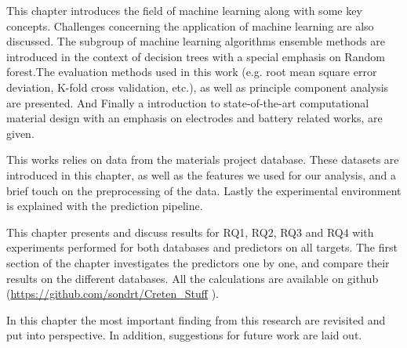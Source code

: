 
This chapter introduces the field of machine learning along with some key concepts. Challenges concerning the application of machine learning are also discussed. The subgroup of machine learning algorithms ensemble methods are introduced in the context of decision trees with a special emphasis on Random forest.The evaluation methods used in this work (e.g. root mean square error deviation, K-fold cross validation, etc.), as well as principle component analysis are presented. And Finally a introduction to state-of-the-art computational material design with an emphasis on electrodes and battery related works, are given. 




This works relies on data from the materials project database. These datasets are introduced in this chapter, as well as the features we used for our analysis, and a brief touch on the preprocessing of the data. Lastly the experimental environment is explained with the prediction pipeline. 




This chapter presents and discuss results for RQ1, RQ2, RQ3 and RQ4 with experiments performed for both databases and predictors on all targets. The first section of the chapter investigates the predictors one by one, and compare their results on the different databases. All the calculations are available on github (\url{https://github.com/sondrt/Creten_Stuff} \cite{github}).




In this chapter the most important finding from this research are revisited and put into perspective. In addition, suggestions for future work are laid out.


